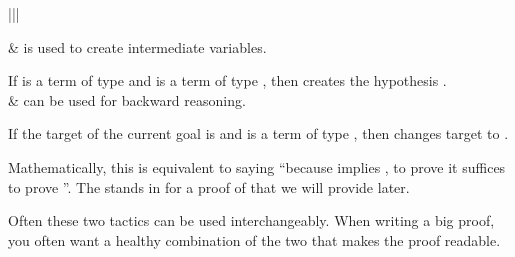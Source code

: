 \documentclass[letterpaper,10pt,english]{sphinxmanual}
\begin{document}
\begin{savenotes}\sphinxattablestart
\centering
\begin{tabular}[t]{|||}
\hline

\sphinxAtStartPar
{}
&
\sphinxAtStartPar
{} is used to create intermediate variables.

\sphinxAtStartPar
If  is a term of type  and
 is a term of type , then
 creates the hypothesis  .
\\
\hline
\sphinxAtStartPar
{}
&
\sphinxAtStartPar
{} can be used for backward reasoning.

\sphinxAtStartPar
If the target of the current goal is  and
 is a term of type , then
 changes target to .

\sphinxAtStartPar
Mathematically, this is equivalent to saying “because  implies , to prove  it suffices to prove ”.
The \sphinxcode{\sphinxupquote{\_}} stands in for a proof of  that we will provide later.
\\
\hline
\end{tabular}
\par
\sphinxattableend\end{savenotes}

\sphinxAtStartPar
Often these two tactics can be used interchangeably.
When writing a big proof, you often want a healthy combination of the two that makes the proof readable.
\end{document}
